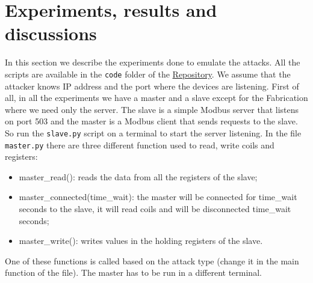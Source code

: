 \documentclass[12pt]{article}
\begin{document}
\section{Experiments, results and discussions}
In this section we describe the experiments done to emulate the attacks. 
All the scripts are available in the \texttt{code} folder of the \href{https://github.com/auli16/cpsProjectModBus}{Repository}.
We assume that the attacker knows IP address and the port where the devices are listening. 
First of all, in all the experiments we have a master and a slave except for the Fabrication where we need only the server.
The slave is a simple Modbus server that listens on port 503 and the master is a Modbus 
client that sends requests to the slave. So run the \texttt{slave.py} script on a terminal to start 
the server listening. In the file 
\texttt{master.py} there are three different function used to read, write coils and registers:
\begin{itemize}
    \item master\_read(): reads the data from all the registers of the slave;
    \item master\_connected(time\_wait): the master will be connected for 
    time\_wait seconds to the slave, it will read coils and will be disconnected time\_wait seconds;
    \item master\_write(): writes values in the holding registers of the slave.
\end{itemize}
One of these functions is called based on the attack type (change it in the main function of the file).
The master has to be run in a different terminal.
\end{document}

